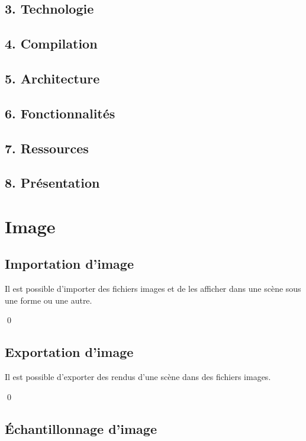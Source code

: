 \documentclass[12pt]{article}
\newcommand{\state}{\noindent}
\begin{document}
\subsection*{3. Technologie}

\subsection*{4. Compilation}

\subsection*{5. Architecture}

\subsection*{6. Fonctionnalités}

\subsection*{7. Ressources}

\subsection*{8. Présentation}

\pagebreak

\section{Image}

\subsection{Importation d'image}

\state
Il est possible d'importer des fichiers images et de les afficher dans une scène sous une forme ou une autre.

\qed

\subsection{Exportation d'image}

\state
Il est possible d'exporter des rendus d'une scène dans des fichiers images.

\qed

\subsection{Échantillonnage d'image}
\end{document}
